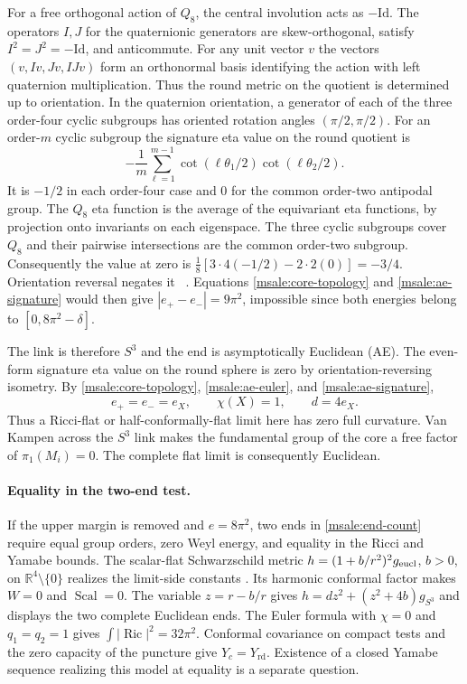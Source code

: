\documentclass[11pt]{article}
\numberwithin{equation}{section}
\theoremstyle{definition}
\theoremstyle{remark}
\DeclareMathOperator{\Ric}{Ric}
\DeclareMathOperator{\Scal}{Scal}
\newcommand{\rd}{\mathrm{rd}}
\begin{document}
For a free orthogonal action of \(Q_8\), the central involution
acts as \(-\mathrm{Id}\). The operators \(I,J\) for the quaternionic
generators are skew-orthogonal, satisfy \(I^2=J^2=-\mathrm{Id}\),
and anticommute. For any unit vector \(v\) the vectors
\((v,Iv,Jv,IJv)\) form an orthonormal basis identifying the action
with left quaternion multiplication. Thus the round metric on
the quotient is determined up to orientation. In the quaternion
orientation, a generator of each of the three order-four cyclic
subgroups has oriented rotation angles \((\pi/2,\pi/2)\). For an
order-\(m\) cyclic subgroup the signature eta value on the round
quotient is
\[
 -\frac1m\sum_{\ell=1}^{m-1}
     \cot(\ell\theta_1/2)\cot(\ell\theta_2/2).
\]
It is \(-1/2\) in each order-four case and \(0\) for the common
order-two antipodal group. The \(Q_8\) eta function is the average
of the equivariant eta functions, by projection onto invariants
on each eigenspace. The three cyclic subgroups cover \(Q_8\) and
their pairwise intersections are the common order-two subgroup.
Consequently the value at zero is
\(\tfrac18[3\cdot4(-1/2)-2\cdot2(0)]=-3/4\).
Orientation reversal negates it
~\cite[\S2, Proposition (2.12)]{APS1975SpectralII}.
Equations \eqref{msale:core-topology} and
\eqref{msale:ae-signature} would then give
\(|e_+-e_-|=9\pi^2\), impossible since both energies belong to
\([0,8\pi^2-\delta]\).

The link is therefore \(S^3\) and the end is asymptotically
Euclidean (AE). The even-form signature eta value on the round
sphere is zero by orientation-reversing isometry. By
\eqref{msale:core-topology}, \eqref{msale:ae-euler}, and
\eqref{msale:ae-signature},
\begin{equation}\label{msale:ae-budgets}
 e_+=e_-=e_X,\qquad \chi(X)=1,\qquad d=4e_X .
\end{equation}
Thus a Ricci-flat or half-conformally-flat limit here has zero
full curvature. Van Kampen across the \(S^3\) link makes the
fundamental group of the core a free factor of \(\pi_1(M_i)=0\).
The complete flat limit is consequently Euclidean.

\paragraph{Equality in the two-end test.}
If the upper margin is removed and \(e=8\pi^2\), two ends in
\eqref{msale:end-count} require equal group orders, zero Weyl energy,
and equality in the Ricci and Yamabe bounds. The scalar-flat
Schwarzschild metric \(h=(1+b/r^2)^2g_{\rm eucl}\), \(b>0\), on
\(\mathbb R^4\setminus\{0\}\) realizes the limit-side constants
\cite[remark after Theorem 1.3]{TianViaclovsky2005ALE}.
Its harmonic conformal factor makes \(W=0\) and \(\Scal=0\).
The variable \(z=r-b/r\) gives
\(h=dz^2+(z^2+4b)g_{S^3}\) and displays the two complete Euclidean
ends. The Euler formula with \(\chi=0\) and \(q_1=q_2=1\) gives
\(\int|\Ric|^2=32\pi^2\). Conformal covariance on compact tests
and the zero capacity of the puncture give \(Y_c=Y_{\rd}\).
Existence of a closed Yamabe sequence realizing this model at
equality is a separate question.
\end{document}
